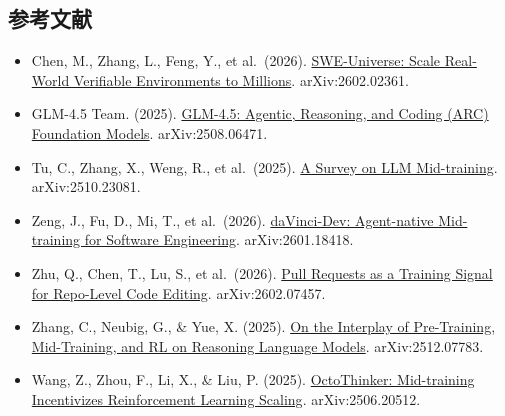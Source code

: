 \FloatBarrier
{}
\hypertarget{ux53c2ux8003ux6587ux732e-117}{%
\subsection{参考文献}\label{ux53c2ux8003ux6587ux732e-117}}

\vspace{0.25em}
\begin{itemize}
\tightlist
\item
  Chen, M., Zhang, L., Feng, Y., et al.~(2026). \href{https://arxiv.org/abs/2602.02361}{SWE-Universe: Scale Real-World Verifiable Environments to Millions}. arXiv:2602.02361.
\item
  GLM-4.5 Team. (2025). \href{https://arxiv.org/abs/2508.06471}{GLM-4.5: Agentic, Reasoning, and Coding (ARC) Foundation Models}. arXiv:2508.06471.
\item
  Tu, C., Zhang, X., Weng, R., et al.~(2025). \href{https://arxiv.org/abs/2510.23081}{A Survey on LLM Mid-training}. arXiv:2510.23081.
\item
  Zeng, J., Fu, D., Mi, T., et al.~(2026). \href{https://arxiv.org/abs/2601.18418}{daVinci-Dev: Agent-native Mid-training for Software Engineering}. arXiv:2601.18418.
\item
  Zhu, Q., Chen, T., Lu, S., et al.~(2026). \href{https://arxiv.org/abs/2602.07457}{Pull Requests as a Training Signal for Repo-Level Code Editing}. arXiv:2602.07457.
\item
  Zhang, C., Neubig, G., \& Yue, X. (2025). \href{https://arxiv.org/abs/2512.07783}{On the Interplay of Pre-Training, Mid-Training, and RL on Reasoning Language Models}. arXiv:2512.07783.
\item
  Wang, Z., Zhou, F., Li, X., \& Liu, P. (2025). \href{https://arxiv.org/abs/2506.20512}{OctoThinker: Mid-training Incentivizes Reinforcement Learning Scaling}. arXiv:2506.20512.
\end{itemize}

\clearpage
